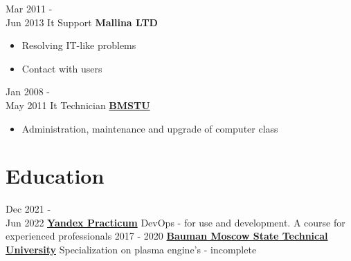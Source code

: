 \documentclass[a4paper]{twentysecondcv} %
\begin{document}
\begin{twenty}
    \twentyitem
        {Mar 2011 - \\ Jun 2013}
        {It Support }
        {\textbf{Mallina LTD}}
        {}
        {
            \begin{itemize}
                \item Resolving IT-like problems
                \item Contact with users
            \end{itemize}
        }
    \twentyitem
        {Jan 2008 - \\ May 2011}
        {It Technician}
        {\href{https://www.bmstu.ru/}{\textbf{BMSTU}}}
        {}
        {
            \begin{itemize}
                \item Administration, maintenance and upgrade of computer class
            \end{itemize}
        }
\end{twenty}


\section{Education}

\begin{twenty} %
	\twentyitem
    	{Dec 2021 -\\ Jun 2022}
        {}
        {}
        {\href{https://practicum.yandex.ru/promo/devops-course}{\textbf{Yandex Practicum}}}
        {DevOps - for use and development. A course for experienced professionals}
	\twentyitem
    	{2017 - 2020}
        {}
        {}
        {\href{https://www.bmstu.ru/}{\textbf{Bauman Moscow State Technical University}}}
        {Specialization on plasma engine's - incomplete}
\end{twenty}


\end{document}
